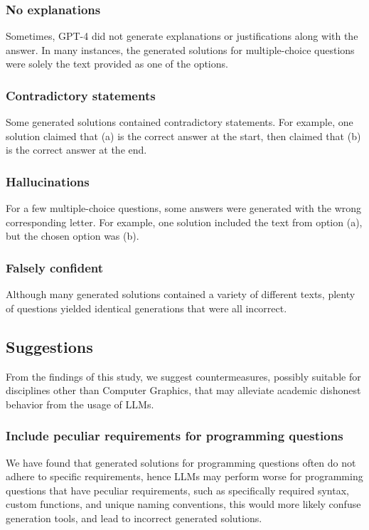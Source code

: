\documentclass[sigconf,authordraft]{acmart}
\begin{document}
\subsubsection*{No explanations}
Sometimes, GPT-4 did not generate explanations or justifications along with the answer. In many instances, the generated solutions for multiple-choice questions were solely the text provided as one of the options.

\subsubsection*{Contradictory statements}
Some generated solutions contained contradictory statements. For example, one solution claimed that (a) is the correct answer at the start, then claimed that (b) is the correct answer at the end.

\subsubsection*{Hallucinations}
For a few multiple-choice questions, some answers were generated with the wrong corresponding letter. For example, one solution included the text from option (a), but the chosen option was (b).

\subsubsection*{Falsely confident}
Although many generated solutions contained a variety of different texts, plenty of questions yielded identical generations that were all incorrect.

\subsection{Suggestions}
From the findings of this study, we suggest countermeasures, possibly suitable for disciplines other than Computer Graphics, that may alleviate academic dishonest behavior from the usage of LLMs.

\subsubsection*{Include peculiar requirements for programming questions}
We have found that generated solutions for programming questions often do not adhere to specific requirements, hence LLMs may perform worse for programming questions that have peculiar requirements, such as specifically required syntax, custom functions, and unique naming conventions, this would more likely confuse generation tools, and lead to incorrect generated solutions.
\end{document}

